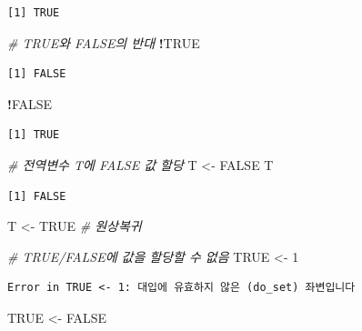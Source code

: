 \documentclass[
  11pt,
]{krantz}
\newenvironment{Shaded}{\begin{snugshade}}{\end{snugshade}}
\newcommand{\CommentTok}[1]{\textcolor[rgb]{0.37,0.37,0.37}{\textit{#1}}}
\newcommand{\DecValTok}[1]{\textcolor[rgb]{0.06,0.06,0.06}{#1}}
\newcommand{\NormalTok}[1]{#1}
\newcommand{\OperatorTok}[1]{\textcolor[rgb]{0.43,0.43,0.43}{\textbf{#1}}}
\newcommand{\OtherTok}[1]{\textcolor[rgb]{0.37,0.37,0.37}{#1}}
\newcommand{\StringTok}[1]{\textcolor[rgb]{0.5,0.5,0.5}{#1}}
\begin{document}
\begin{verbatim}
[1] TRUE
\end{verbatim}

\begin{Shaded}
\begin{Highlighting}[]
\CommentTok{# TRUE와 FALSE의 반대}
\OperatorTok{!}\OtherTok{TRUE}
\end{Highlighting}
\end{Shaded}

\begin{verbatim}
[1] FALSE
\end{verbatim}

\begin{Shaded}
\begin{Highlighting}[]
\OperatorTok{!}\OtherTok{FALSE}
\end{Highlighting}
\end{Shaded}

\begin{verbatim}
[1] TRUE
\end{verbatim}

\begin{Shaded}
\begin{Highlighting}[]
\CommentTok{# 전역변수 T에 FALSE 값 할당}
\NormalTok{T <-}\StringTok{ }\OtherTok{FALSE}
\NormalTok{T}
\end{Highlighting}
\end{Shaded}

\begin{verbatim}
[1] FALSE
\end{verbatim}

\begin{Shaded}
\begin{Highlighting}[]
\NormalTok{T <-}\StringTok{ }\OtherTok{TRUE}  \CommentTok{# 원상복귀}

\CommentTok{# TRUE/FALSE에 값을 할당할 수 없음}
\OtherTok{TRUE}\NormalTok{ <-}\StringTok{ }\DecValTok{1}
\end{Highlighting}
\end{Shaded}

\begin{verbatim}
Error in TRUE <- 1: 대입에 유효하지 않은 (do_set) 좌변입니다
\end{verbatim}

\begin{Shaded}
\begin{Highlighting}[]
\OtherTok{TRUE}\NormalTok{ <-}\StringTok{ }\OtherTok{FALSE}
\end{Highlighting}
\end{Shaded}
\end{document}
